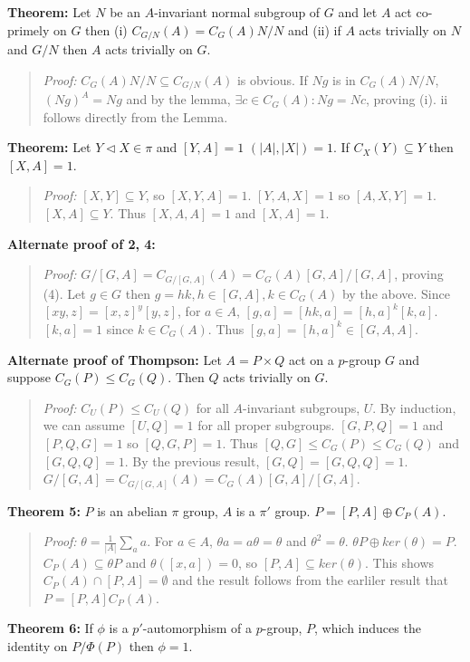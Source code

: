 {\bf  Theorem:} Let $N$ be an $A$-invariant normal subgroup of $G$ and
let $A$ act co-primely on $G$ then (i)
$C_{G/N}(A)= C_G(A)N/N$ and
(ii) if $A$ acts trivially on $N$ and $G/N$ then $A$ acts trivially on $G$.
\begin{quote}
\emph{Proof:}  $C_G(A)N/N \subseteq C_{G/N}(A) $ is obvious.
If $Ng$ is in $C_G(A)N/N$, $(Ng)^A=Ng$ and by
the lemma, $\exists c \in C_G(A): Ng=Nc$, proving (i).  ii follows directly from the Lemma.
\end{quote}
{\bf Theorem:} Let $Y \lhd X \in \pi$ and $[Y,A]=1$ $(|A|, |X|) = 1$.  If $C_X(Y) \subseteq Y$ then $[X,A]=1$.
\begin{quote}
\emph{Proof:}
$[X, Y] \subseteq Y$, so $[X, Y, A] = 1$.  $[Y, A, X] =1$ so $[A, X, Y] = 1$.
$[X, A] \subseteq Y$.  Thus $[X,A,A]=1$ and $[X,A]=1$.
\end{quote}
{\bf Alternate proof of 2, 4:}
\begin{quote}
\emph{Proof:}
$G/[G,A] = C_{G/[G,A]}(A) = C_G(A)[G,A]/[G,A]$, proving (4).  
Let $g \in G$ then $g = hk, h \in [G,A], k \in C_G(A)$ by the above. 
Since $[xy, z]= [x,z]^y [y,z]$, for $a \in A$,
$[g,a]= [hk,a] = [h,a]^k [k,a]$.  $[k,a]=1$ since $k \in C_G(A)$.  Thus
$[g,a] = [h,a]^k \in [G,A,A]$.
\end{quote}
{\bf Alternate proof of Thompson:}  Let $A= P \times Q$ act on a $p$-group $G$ and suppose $C_G(P) \leq C_G(Q)$.  Then
$Q$ acts trivially on $G$.
\begin{quote}
\emph{Proof:}  $C_U(P) \leq C_U(Q)$ for all $A$-invariant subgroups, $U$.  By induction, we can assume
$[U,Q]=1$ for all proper subgroups.  $[G,P,Q]=1$ and $[P, Q, G] =1$ so $[Q, G, P]=1$.  Thus
$[Q,G] \leq C_G(P) \leq C_G(Q)$ and $[G,Q,Q] = 1$.  By the previous result, $[G,Q]=[G,Q,Q]=1$.
$G/[G,A] = C_{G/[G,A]}(A) = C_G(A)[G,A]/[G,A]$.  
\end{quote}
{\bf Theorem 5:} $P$ is an abelian $\pi$ group, $A$ is a $\pi'$ group.  $P= [P,A] \oplus C_P(A)$.
\begin{quote}
\emph{Proof:}
$\theta= {\frac 1 {|A|}} \sum_a a$.  For $a \in A$, $\theta a = a \theta = \theta$ and
$\theta^2= \theta$. $\theta P \oplus ker(\theta)= P$.  $C_P(A) \subseteq \theta P$ and
$\theta([x,a]) =0$, so $[P,A] \subseteq ker(\theta)$.  This shows $C_P(A) \cap [P,A] = \emptyset$
and the result follows from the earliler result that $P= [P,A] C_P(A)$.
\end{quote}
{\bf Theorem 6:}
If $\phi$ is a $p'$-automorphism of a $p$-group, $P$, which induces the identity on
$P/ \Phi(P)$ then $\phi= 1$.
